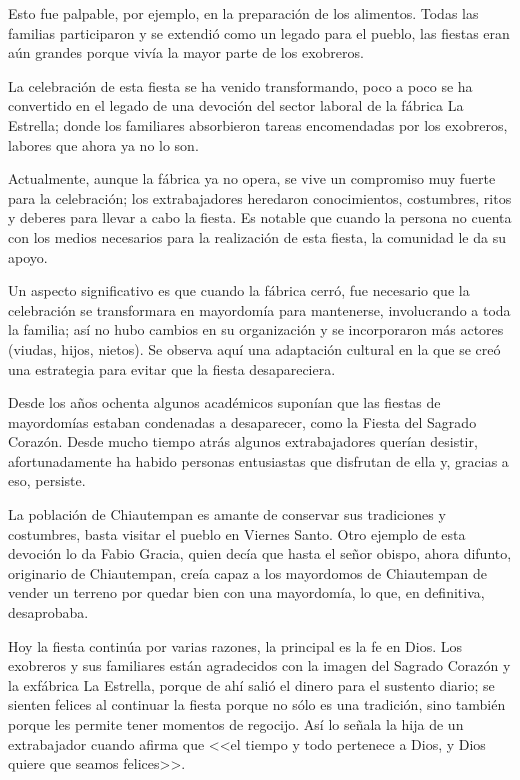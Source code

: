 \documentclass[14pt,letterpaper,twoside]{extbook} %
\begin{document}
Esto fue palpable, por ejemplo, en la preparación de los alimentos. Todas las familias participaron y se extendió como un legado para el pueblo, las fiestas eran aún grandes porque vivía la mayor parte de los exobreros.

La celebración de esta fiesta se ha venido transformando, poco a poco se ha convertido en el legado de una devoción del sector laboral de la fábrica La Estrella; donde los familiares absorbieron tareas encomendadas por los exobreros, labores que ahora ya no lo son.

Actualmente, aunque la fábrica ya no opera, se vive un compromiso muy fuerte para la celebración; los extrabajadores heredaron conocimientos, costumbres, ritos y deberes para llevar a cabo la fiesta. Es notable que cuando la persona no cuenta con los medios necesarios para la realización de esta fiesta, la comunidad le da su apoyo.

Un aspecto significativo es que cuando la fábrica cerró, fue necesario que la celebración se transformara en mayordomía para mantenerse, involucrando a toda la familia; así no hubo cambios en su organización y se incorporaron más actores (viudas, hijos, nietos). Se observa
aquí una adaptación cultural en la que se creó una estrategia para evitar que la fiesta desapareciera.

Desde los años ochenta algunos académicos suponían que las fiestas de mayordomías estaban condenadas a desaparecer, como la Fiesta del Sagrado Corazón. Desde mucho tiempo atrás algunos extrabajadores querían desistir, afortunadamente ha habido personas entusiastas que disfrutan de ella y, gracias a eso, persiste.

La población de Chiautempan es amante de conservar sus tradiciones y costumbres, basta visitar el pueblo en Viernes Santo. Otro ejemplo de esta devoción lo da Fabio Gracia, quien decía que hasta el señor obispo, ahora difunto, originario de Chiautempan, creía capaz a los mayordomos de Chiautempan de vender un terreno por quedar bien con una mayordomía, lo que, en definitiva, desaprobaba.

Hoy la fiesta continúa por varias razones, la principal es la fe en Dios. Los exobreros y sus familiares están agradecidos con la imagen del Sagrado Corazón y la exfábrica La Estrella, porque de ahí salió el dinero para el sustento diario; se sienten felices al continuar la fiesta
porque no sólo es una tradición, sino también porque les permite tener momentos de regocijo. Así lo señala la hija de un extrabajador cuando afirma que <<el tiempo y todo pertenece a Dios, y Dios quiere que seamos felices>>.
\end{document}
